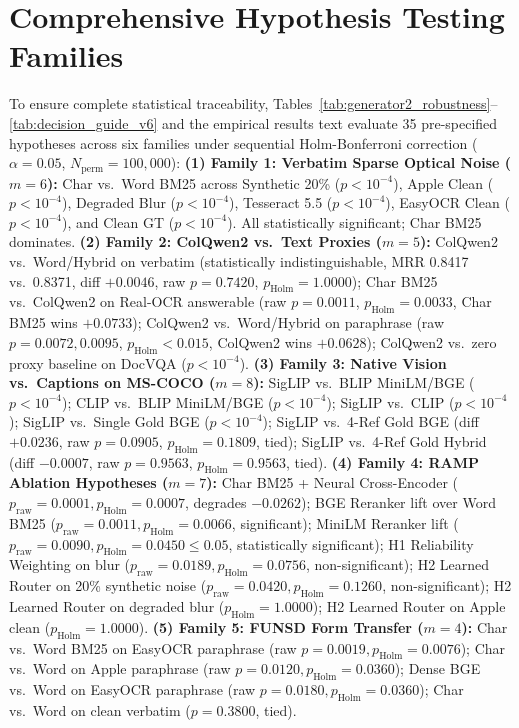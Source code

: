 \section{Comprehensive Hypothesis Testing Families}
\label{sec:appendix_holm}
{\scriptsize To ensure complete statistical traceability, Tables~\ref{tab:generator2_robustness}--\ref{tab:decision_guide_v6} and the empirical results text evaluate 35 pre-specified hypotheses across six families under sequential Holm-Bonferroni correction ($\alpha=0.05$, $N_{\text{perm}}=100{,}000$):
\textbf{(1) Family 1: Verbatim Sparse Optical Noise ($m=6$):} Char vs.\ Word BM25 across Synthetic 20\% ($p < 10^{-4}$), Apple Clean ($p < 10^{-4}$), Degraded Blur ($p < 10^{-4}$), Tesseract 5.5 ($p < 10^{-4}$), EasyOCR Clean ($p < 10^{-4}$), and Clean GT ($p < 10^{-4}$). All statistically significant; Char BM25 dominates.
\textbf{(2) Family 2: ColQwen2 vs.\ Text Proxies ($m=5$):} ColQwen2 vs.\ Word/Hybrid on verbatim (statistically indistinguishable, MRR 0.8417 vs.\ 0.8371, diff $+0.0046$, raw $p=0.7420$, $p_{\text{Holm}}=1.0000$); Char BM25 vs.\ ColQwen2 on Real-OCR answerable (raw $p=0.0011$, $p_{\text{Holm}}=0.0033$, Char BM25 wins $+0.0733$); ColQwen2 vs.\ Word/Hybrid on paraphrase (raw $p=0.0072, 0.0095$, $p_{\text{Holm}} < 0.015$, ColQwen2 wins $+0.0628$); ColQwen2 vs.\ zero proxy baseline on DocVQA ($p < 10^{-4}$).
\textbf{(3) Family 3: Native Vision vs.\ Captions on MS-COCO ($m=8$):} SigLIP vs.\ BLIP MiniLM/BGE ($p < 10^{-4}$); CLIP vs.\ BLIP MiniLM/BGE ($p < 10^{-4}$); SigLIP vs.\ CLIP ($p < 10^{-4}$); SigLIP vs.\ Single Gold BGE ($p < 10^{-4}$); SigLIP vs.\ 4-Ref Gold BGE (diff $+0.0236$, raw $p=0.0905$, $p_{\text{Holm}}=0.1809$, tied); SigLIP vs.\ 4-Ref Gold Hybrid (diff $-0.0007$, raw $p=0.9563$, $p_{\text{Holm}}=0.9563$, tied).
\textbf{(4) Family 4: RAMP Ablation Hypotheses ($m=7$):} Char BM25 + Neural Cross-Encoder ($p_{\text{raw}}=0.0001, p_{\text{Holm}}=0.0007$, degrades $-0.0262$); BGE Reranker lift over Word BM25 ($p_{\text{raw}}=0.0011, p_{\text{Holm}}=0.0066$, significant); MiniLM Reranker lift ($p_{\text{raw}}=0.0090, p_{\text{Holm}}=0.0450 \le 0.05$, statistically significant); H1 Reliability Weighting on blur ($p_{\text{raw}}=0.0189, p_{\text{Holm}}=0.0756$, non-significant); H2 Learned Router on 20\% synthetic noise ($p_{\text{raw}}=0.0420, p_{\text{Holm}}=0.1260$, non-significant); H2 Learned Router on degraded blur ($p_{\text{Holm}}=1.0000$); H2 Learned Router on Apple clean ($p_{\text{Holm}}=1.0000$).
\textbf{(5) Family 5: FUNSD Form Transfer ($m=4$):} Char vs.\ Word BM25 on EasyOCR paraphrase (raw $p=0.0019, p_{\text{Holm}}=0.0076$); Char vs.\ Word on Apple paraphrase (raw $p=0.0120, p_{\text{Holm}}=0.0360$); Dense BGE vs.\ Word on EasyOCR paraphrase (raw $p=0.0180, p_{\text{Holm}}=0.0360$); Char vs.\ Word on clean verbatim ($p=0.3800$, tied).
}
